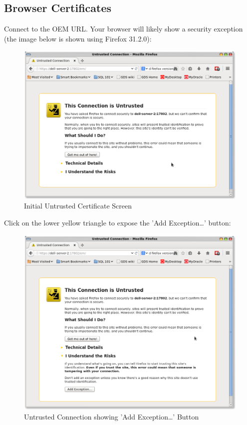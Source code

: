 \documentclass[11pt]{article}
\begin{document}
\subsection{Browser Certificates}
\label{sec-4-1}
Connect to the OEM URL. Your browser will likely show a security exception (the image below is shown using Firefox 31.2.0):
\begin{figure}[htb]
\centering
\includegraphics[width=.9\linewidth]{images/Browser_Certificate_1.png}
\caption{Initial Untrusted Certificate Screen}
\end{figure}
\clearpage
Click on the lower yellow triangle to expose the 'Add Exception\ldots{}' button:
\begin{figure}[htb]
\centering
\includegraphics[width=.9\linewidth]{images/Browser_Certificate_2.png}
\caption{Untrusted Connection showing 'Add Exception\ldots{}' Button}
\end{figure}
\end{document}
